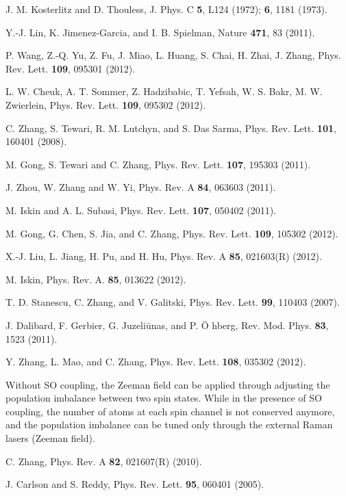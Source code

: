 \documentclass[prl,showpacs,twocolumn]{revtex4}
\begin{document}
\begin{thebibliography}{99}
 J. M. Kosterlitz and D. Thouless, J. Phys. C \textbf{5}, L124
(1972); \textbf{6}, 1181 (1973).

 Y.-J. Lin, K. Jimenez-Garcia, and I. B. Spielman, Nature
\textbf{471}, 83 (2011).

 P. Wang, Z.-Q. Yu, Z. Fu, J. Miao, L. Huang, S. Chai, H.
Zhai, J. Zhang, Phys. Rev. Lett. \textbf{109}, 095301 (2012).

 L. W. Cheuk, A. T. Sommer, Z. Hadzibabic, T. Yefsah,
W. S. Bakr, M. W. Zwierlein, Phys. Rev. Lett. \textbf{109}, 095302 (2012).

 C. Zhang, S. Tewari, R. M. Lutchyn, and S. Das Sarma,
Phys. Rev. Lett. \textbf{101}, 160401 (2008).

 M. Gong, S. Tewari and C. Zhang, Phys. Rev. Lett. \textbf{%
107}, 195303 (2011).

 J. Zhou, W. Zhang and W. Yi, Phys. Rev. A \textbf{84},
063603 (2011).

 M. Iskin and A. L. Subasi, Phys. Rev. Lett. \textbf{107},
050402 (2011).

 M. Gong, G. Chen, S. Jia, and C. Zhang, Phys. Rev. Lett.
\textbf{109}, 105302 (2012).

 X.-J. Liu, L. Jiang, H. Pu, and H. Hu, Phys. Rev. A \textbf{%
85}, 021603(R) (2012).

 M. Iskin, Phys. Rev. A. \textbf{85}, 013622 (2012).

 T. D. Stanescu, C. Zhang, and V. Galitski, Phys. Rev. Lett.
\textbf{99}, 110403 (2007).

 J. Dalibard, F. Gerbier, G. Juzeli\={u}nas, and P. \"{O}%
hberg, Rev. Mod. Phys. \textbf{83}, 1523 (2011).

 Y. Zhang, L. Mao, and C. Zhang, Phys. Rev. Lett. \textbf{108},
035302 (2012).

 Without SO coupling, the Zeeman field can be applied through
adjusting the population imbalance between two spin states. While in the
presence of SO coupling, the number of atoms at each spin channel is not
conserved anymore, and the population imbalance can be tuned only through
the external Raman lasers (Zeeman field).

 C. Zhang, Phys. Rev. A \textbf{82}, 021607(R) (2010).

 J. Carlson and S. Reddy, Phys. Rev. Lett. \textbf{95},
060401 (2005).


\end{thebibliography}
\end{document}
